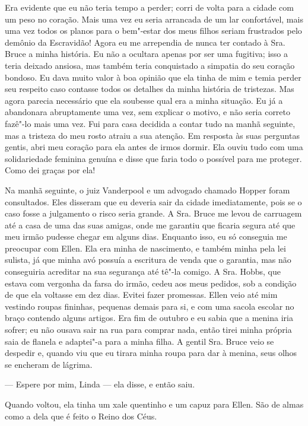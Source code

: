Era evidente que eu não teria tempo a
perder; corri de volta para a cidade com um peso no coração. Mais uma
vez eu seria arrancada de um lar confortável, mais uma vez todos os
planos para o bem"-estar dos meus filhos seriam frustrados pelo demônio
da Escravidão! Agora eu me arrependia de nunca ter contado à Sra. Bruce
a minha história. Eu não a ocultara apenas por ser uma fugitiva; isso a
teria deixado ansiosa, mas também teria conquistado a simpatia do seu
coração bondoso. Eu dava muito valor à boa opinião que ela tinha de mim
e temia perder seu respeito caso contasse todos os detalhes da minha
história de tristezas. Mas agora parecia necessário que ela soubesse
qual era a minha situação. Eu já a abandonara abruptamente uma vez, sem
explicar o motivo, e não seria correto fazê"-lo mais uma vez. Fui para
casa decidida a contar tudo na manhã seguinte, mas a tristeza do meu
rosto atraiu a sua atenção. Em resposta às suas perguntas gentis, abri
meu coração para ela antes de irmos dormir. Ela ouviu tudo com uma
solidariedade feminina genuína e disse que faria todo o possível para me
proteger. Como dei graças por ela!

Na manhã seguinte, o juiz Vanderpool e
um advogado chamado Hopper foram consultados. Eles disseram que eu
deveria sair da cidade imediatamente, pois se o caso fosse a julgamento
o risco seria grande. A Sra. Bruce me levou de carruagem até a casa de
uma das suas amigas, onde me garantiu que ficaria segura até que meu
irmão pudesse chegar em alguns dias. Enquanto isso, eu só conseguia me
preocupar com Ellen. Ela era minha de nascimento, e também minha pela
lei sulista, já que minha avó possuía a escritura de venda que o
garantia, mas não conseguiria acreditar na sua segurança até tê"-la
comigo. A Sra. Hobbs, que estava com vergonha da farsa do irmão, cedeu
aos meus pedidos, sob a condição de que ela voltasse em dez dias. Evitei
fazer promessas. Ellen veio até mim vestindo roupas fininhas, pequenas
demais para si, e com uma sacola escolar no braço contendo alguns
artigos. Era fim de outubro e eu sabia que a menina iria sofrer; eu não
ousava sair na rua para comprar nada, então tirei minha própria saia de
flanela e adaptei"-a para a minha filha. A gentil Sra. Bruce veio se
despedir e, quando viu que eu tirara minha roupa para dar à menina, seus
olhos se encheram de lágrima.

--- Espere por mim, Linda --- ela disse, e então saiu.

Quando voltou, ela tinha um xale quentinho e um capuz para Ellen. São de
almas como a dela que é feito o Reino dos Céus.

